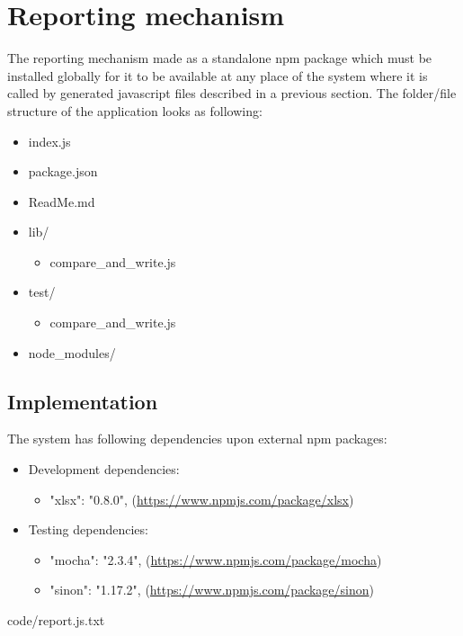 {\section{Reporting mechanism}
\label{sec:report}
The reporting mechanism made as a standalone npm package which must be installed globally for it to be available at any place of the system where it is called by generated javascript files described in a previous section. 
The folder/file structure of the application looks as following:
\begin{itemize}
	\item index.js
	\item package.json
	\item ReadMe.md
	\item lib/
	\begin{itemize}
		\item compare\_and\_write.js
	\end{itemize}
	\item test/
	\begin{itemize}
		\item compare\_and\_write.js
	\end{itemize}
	\item node\_modules/
\end{itemize}

\subsection{Implementation}
The system has following dependencies upon external npm packages:
\begin{itemize}
	\item Development dependencies:
	\begin{itemize}
		\item "xlsx": "0.8.0", (\url{https://www.npmjs.com/package/xlsx})
	\end{itemize}
	\item Testing dependencies:
	\begin{itemize}
		\item "mocha": "2.3.4", (\url{https://www.npmjs.com/package/mocha})
		\item "sinon": "1.17.2", (\url{https://www.npmjs.com/package/sinon})
	\end{itemize}
\end{itemize}
	


{code/report.js.txt}

}
